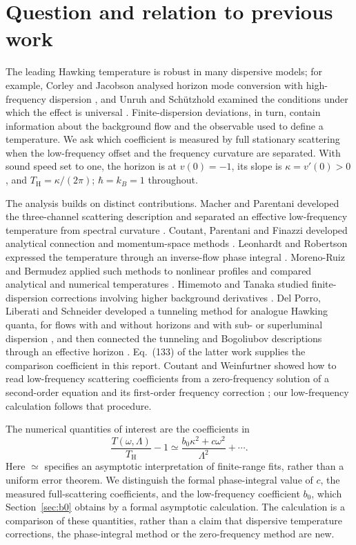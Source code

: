 \documentclass[10pt,a4paper]{article}
\newcommand{\HawkingT}{T_{\mathrm H}}
\begin{document}
\section{Question and relation to previous work}
\label{sec:intro}
The leading Hawking temperature is robust in many dispersive models; for
example, Corley and Jacobson analysed horizon mode conversion with
high-frequency dispersion \cite{CJ}, and Unruh and Sch\"utzhold examined
the conditions under which the effect is universal \cite{US}.
Finite-dispersion deviations, in turn, contain information about the background
flow and the observable used to define a temperature. We ask which
coefficient is measured by full stationary scattering when the low-frequency
offset and the frequency curvature are separated. With sound speed set to
one, the horizon is at $v(0)=-1$, its slope is $\kappa=v'(0)>0$, and
$\HawkingT=\kappa/(2\pi)$; $\hbar=k_B=1$ throughout.

The analysis builds on distinct contributions. Macher and Parentani
developed the three-channel scattering description and separated an
effective low-frequency temperature from spectral curvature
\cite{MP}. Coutant, Parentani and Finazzi developed analytical connection
and momentum-space methods \cite{CPF}. Leonhardt and Robertson expressed
the temperature through an inverse-flow phase integral \cite{LR}.
Moreno-Ruiz and Bermudez applied such methods to nonlinear profiles and
compared analytical and numerical temperatures \cite{MRB}.
Himemoto and Tanaka studied finite-dispersion corrections involving
higher background derivatives \cite{HT}. Del Porro, Liberati and
Schneider developed a tunneling method for analogue Hawking quanta, for
flows with and without horizons and with sub- or superluminal dispersion
\cite{DPLS25}, and then connected the tunneling and Bogoliubov
descriptions through an effective horizon \cite{DPLS}. Eq.~(133) of the
latter work supplies the comparison coefficient in this report. Coutant and Weinfurtner showed how to read
low-frequency scattering coefficients from a zero-frequency solution of a
second-order equation and its first-order frequency correction
\cite{CWKdV,CWBdG}; our low-frequency calculation follows that procedure.

The numerical quantities of interest are the coefficients in
\begin{equation}
 \frac{T(\omega,\Lambda)}{\HawkingT}-1
 \simeq \frac{b_0\kappa^2+c\omega^2}{\Lambda^2}+\cdots .
 \label{eq:target}
\end{equation}
Here $\simeq$ specifies an asymptotic interpretation of finite-range fits,
rather than a uniform error theorem. We distinguish the formal
phase-integral value of $c$, the measured full-scattering coefficients,
and the low-frequency coefficient $b_0$, which Section~\ref{sec:b0}
obtains by a formal asymptotic calculation. The calculation is a comparison
of these quantities, rather than a claim that dispersive temperature
corrections, the phase-integral method or the zero-frequency method are
new.
\end{document}
